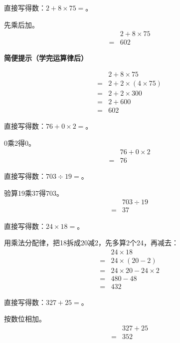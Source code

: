 直接写得数：\(2+8\times75=\)。\par
\begin{BookAnswer}
先乘后加。\[\begin{aligned} &2+8\times75\\={}&602\end{aligned}\]\par\textbf{简便提示（学完运算律后）}\par \[\begin{aligned}&2+8\times75\\={}&2+2\times(4\times75)\\={}&2+2\times300\\={}&2+600\\={}&602\end{aligned}\]
\end{BookAnswer}

直接写得数：\(76+0\times2=\)。\par
\begin{BookAnswer}
0乘2得0。\[\begin{aligned} &76+0\times2\\={}&76\end{aligned}\]
\end{BookAnswer}

直接写得数：\(703\div19=\)。\par
\begin{BookAnswer}
验算19乘37得703。\[\begin{aligned} &703\div19\\={}&37\end{aligned}\]
\end{BookAnswer}

直接写得数：\(24\times18=\)。\par
\begin{BookAnswer}
用乘法分配律，把18拆成20减2，先多算2个24，再减去：\[\begin{aligned} &24\times18\\={}&24\times(20-2)\\={}&24\times20-24\times2\\={}&480-48\\={}&432\end{aligned}\]
\end{BookAnswer}

直接写得数：\(327+25=\)。\par
\begin{BookAnswer}
按数位相加。\[\begin{aligned} &327+25\\={}&352\end{aligned}\]
\end{BookAnswer}

